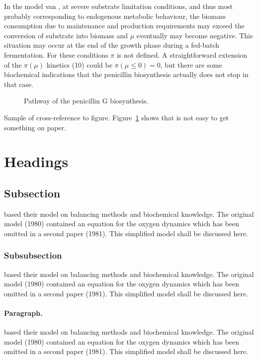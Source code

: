 \documentclass{kluwer}    %
\begin{document}
\begin{article}
In the model van , at severe substrate limitation conditions, and thus most probably corresponding
to endogenous metabolic behaviour, the biomass consumption due to maintenance
and production requirements may exceed the conversion of substrate into
biomass and $\mu$ eventually may become negative. This situation may occur at
the end of the growth phase during a fed-batch fermentation.
For these conditions $\pi$ is not defined. A
straightforward extension of the $\pi(\mu)$ kinetics (10)
could be $\pi(\mu \leq 0)=0$, but there
are some biochemical indications that 
the penicillin biosynthesis actually does not stop in that case. 

\begin{figure} %
\vspace{6pc}
\caption[]{Pathway of the penicillin G biosynthesis.}
\label{penG}
\end{figure}

Sample of cross-reference to figure.
Figure~\ref{penG} shows that is not easy to get something on paper.



\section{Headings}

\subsection{Subsection}
based their model on balancing methods and
biochemical know\-ledge. The original model (1980) contained an equation for the
oxygen dynamics which has been omitted in a second paper 
(1981). This simplified model shall be discussed here.

\subsubsection{Subsubsection}
\cite{Carr-Goldstein,Cohen-Jones88-book} 
based their model on balancing methods and
biochemical know\-ledge. The original model (1980) contained an equation for the
oxygen dynamics which has been omitted in a second paper 
(1981). This simplified model shall be discussed here.

\paragraph{Paragraph.}
\cite{Carr-Goldstein,Cohen-Jones88-book} 
based their model on balancing methods and
biochemical know\-ledge. The original model (1980) contained an equation for the
oxygen dynamics which has been omitted in a second paper 
(1981). This simplified model shall be discussed here.


\end{article}
\end{document}
